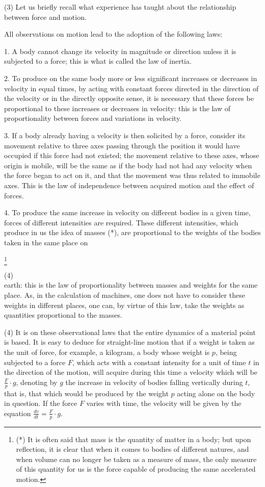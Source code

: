 \documentclass{book}
\begin{document}
(3) Let us briefly recall what experience has taught about the relationship between force and motion.

All observations on motion lead to the adoption of the following laws:

1. A body cannot change its velocity in magnitude or direction unless it is subjected to a force; this is what is called the law of inertia.

2. To produce on the same body more or less significant increases or decreases in velocity in equal times, by acting with constant forces directed in the direction of the velocity or in the directly opposite sense, it is necessary that these forces be proportional to these increases or decreases in velocity: this is the law of proportionality between forces and variations in velocity.

3. If a body already having a velocity is then solicited by a force, consider its movement relative to three axes passing through the position it would have occupied if this force had not existed; the movement relative to these axes, whose origin is mobile, will be the same as if the body had not had any velocity when the force began to act on it, and that the movement was thus related to immobile axes. This is the law of independence between acquired motion and the effect of forces.

4. To produce the same increase in velocity on different bodies in a given time, forces of different intensities are required. These different intensities, which produce in us the idea of masses (*), are proportional to the weights of the bodies taken in the same place on

\footnote{(*) It is often said that mass is the quantity of matter in a body; but upon reflection, it is clear that when it comes to bodies of different natures, and when volume can no longer be taken as a measure of mass, the only measure of this quantity for us is the force capable of producing the same accelerated motion.}

\newpage
(4) \\

earth: this is the law of proportionality between masses and weights for the same place. As, in the calculation of machines, one does not have to consider these weights in different places, one can, by virtue of this law, take the weights as quantities proportional to the masses.

 (4) It is on these observational laws that the entire dynamics of a material point is based. It is easy to deduce for straight-line motion that if a weight is taken as the unit of force, for example, a kilogram, a body whose weight is \(p\), being subjected to a force \(F\), which acts with a constant intensity for a unit of time 
\(t\) in the direction of the motion, will acquire during this time a velocity which will be \(\frac{F}{p} \cdot g\), denoting by \(g\) the increase in velocity of bodies falling vertically during \(t\),
that is, that which would be produced by the weight \(p\) acting alone on the body in question. If the force \(F\) varies with time, the velocity will be given by the equation \(\frac{dv}{dt} = \frac{F}{p} \cdot g\).
\end{document}
